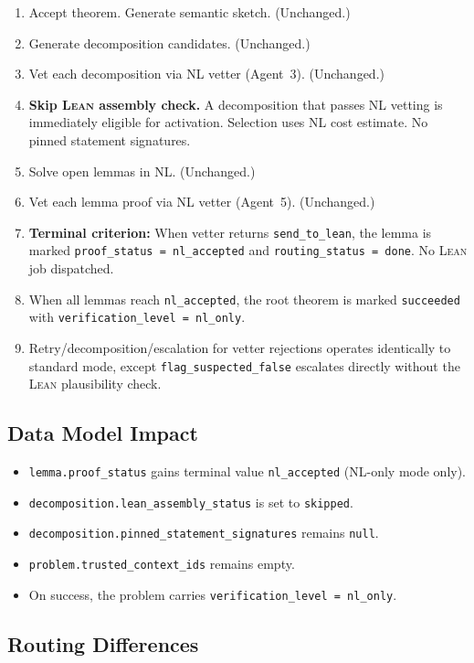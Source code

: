 \documentclass[11pt,a4paper]{article}
\newcommand{\Lean}{\textsc{Lean}}
\begin{document}
\begin{enumerate}[leftmargin=2em]
  \item Accept theorem. Generate semantic sketch. (Unchanged.)
  \item Generate decomposition candidates. (Unchanged.)
  \item Vet each decomposition via NL vetter (Agent~3). (Unchanged.)
  \item \textbf{Skip \Lean{} assembly check.} A decomposition that passes NL vetting is immediately eligible for activation. Selection uses NL cost estimate. No pinned statement signatures.
  \item Solve open lemmas in NL. (Unchanged.)
  \item Vet each lemma proof via NL vetter (Agent~5). (Unchanged.)
  \item \textbf{Terminal criterion:} When vetter returns \texttt{send\_to\_lean}, the lemma is marked \texttt{proof\_status = nl\_accepted} and \texttt{routing\_status = done}. No \Lean{} job dispatched.
  \item When all lemmas reach \texttt{nl\_accepted}, the root theorem is marked \texttt{succeeded} with \texttt{verification\_level = nl\_only}.
  \item Retry/decomposition/escalation for vetter rejections operates identically to standard mode, except \texttt{flag\_suspected\_false} escalates directly without the \Lean{} plausibility check.
\end{enumerate}

\subsection{Data Model Impact}
\begin{itemize}[leftmargin=2em]
  \item \texttt{lemma.proof\_status} gains terminal value \texttt{nl\_accepted} (NL-only mode only).
  \item \texttt{decomposition.lean\_assembly\_status} is set to \texttt{skipped}.
  \item \texttt{decomposition.pinned\_statement\_signatures} remains \texttt{null}.
  \item \texttt{problem.trusted\_context\_ids} remains empty.
  \item On success, the problem carries \texttt{verification\_level = nl\_only}.
\end{itemize}

\subsection{Routing Differences}
\end{document}
